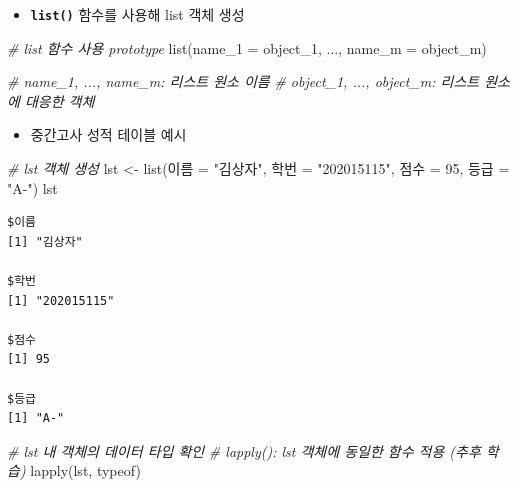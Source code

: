 \documentclass[
  11pt,
]{krantz}
\newenvironment{Shaded}{\begin{snugshade}}{\end{snugshade}}
\newcommand{\AttributeTok}[1]{\textcolor[rgb]{0.61,0.61,0.61}{#1}}
\newcommand{\CommentTok}[1]{\textcolor[rgb]{0.37,0.37,0.37}{\textit{#1}}}
\newcommand{\DecValTok}[1]{\textcolor[rgb]{0.06,0.06,0.06}{#1}}
\newcommand{\FunctionTok}[1]{\textcolor[rgb]{0,0,0}{#1}}
\newcommand{\NormalTok}[1]{#1}
\newcommand{\OtherTok}[1]{\textcolor[rgb]{0.37,0.37,0.37}{#1}}
\newcommand{\StringTok}[1]{\textcolor[rgb]{0.5,0.5,0.5}{#1}}
\providecommand{\tightlist}{%
  \setlength{\itemsep}{0pt}\setlength{\parskip}{0pt}}
\begin{document}
\begin{itemize}
\tightlist
\item
  \textbf{\texttt{list()}} 함수를 사용해 list 객체 생성
\end{itemize}

\footnotesize

\begin{Shaded}
\begin{Highlighting}[]
\CommentTok{\# list 함수 사용 prototype}
\FunctionTok{list}\NormalTok{(}\AttributeTok{name\_1 =}\NormalTok{ object\_1, ..., }\AttributeTok{name\_m =}\NormalTok{ object\_m)}

\CommentTok{\# name\_1, ..., name\_m: 리스트 원소 이름}
\CommentTok{\# object\_1, ..., object\_m: 리스트 원소에 대응한 객체}
\end{Highlighting}
\end{Shaded}

\normalsize

\begin{itemize}
\tightlist
\item
  중간고사 성적 테이블 예시
\end{itemize}

\footnotesize

\begin{Shaded}
\begin{Highlighting}[]
\CommentTok{\# lst 객체 생성}
\NormalTok{lst }\OtherTok{\textless{}{-}} \FunctionTok{list}\NormalTok{(}\StringTok{\textasciigrave{}}\AttributeTok{이름}\StringTok{\textasciigrave{}} \OtherTok{=} \StringTok{"김상자"}\NormalTok{, }
            \StringTok{\textasciigrave{}}\AttributeTok{학번}\StringTok{\textasciigrave{}} \OtherTok{=} \StringTok{"202015115"}\NormalTok{, }
            \StringTok{\textasciigrave{}}\AttributeTok{점수}\StringTok{\textasciigrave{}} \OtherTok{=} \DecValTok{95}\NormalTok{, }
            \StringTok{\textasciigrave{}}\AttributeTok{등급}\StringTok{\textasciigrave{}} \OtherTok{=} \StringTok{"A{-}"}\NormalTok{)}
\NormalTok{lst}
\end{Highlighting}
\end{Shaded}

\begin{verbatim}
$이름
[1] "김상자"

$학번
[1] "202015115"

$점수
[1] 95

$등급
[1] "A-"
\end{verbatim}

\begin{Shaded}
\begin{Highlighting}[]
\CommentTok{\# lst 내 객체의 데이터 타입 확인}
\CommentTok{\# lapply(): lst 객체에 동일한 함수 적용 (추후 학습)}
\FunctionTok{lapply}\NormalTok{(lst, typeof)}
\end{Highlighting}
\end{Shaded}
\end{document}
